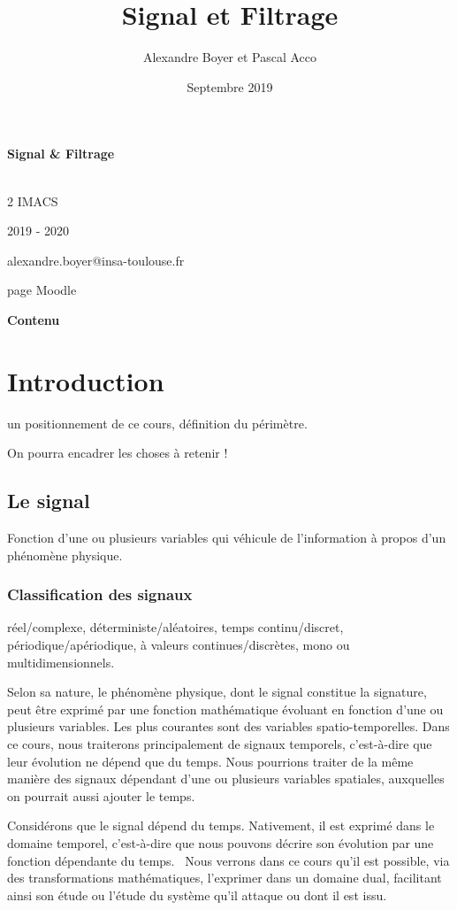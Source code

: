 \documentclass[]{report}
\title{{\huge Signal et Filtrage}}
\author{Alexandre Boyer et Pascal Acco}
\date{Septembre 2019}
\begin{document}
	\maketitle
	
	\textbf{Signal \& Filtrage}
	
	\textbf{}\\
	
	2 IMACS
	
	2019 - 2020
	
	alexandre.boyer@insa-toulouse.fr
	
	page Moodle
	
	\textbf{Contenu}
	\tableofcontents
	
	
\chapter{Introduction}
	
	un positionnement de ce cours, définition du périmètre.
	
	On pourra encadrer les choses à retenir !
	
	\section{Le signal}
	
	
	Fonction d'une ou plusieurs variables qui véhicule de l'information à
	propos d'un phénomène physique.
	
	\subsection{Classification des signaux}
	
	réel/complexe, déterministe/aléatoires, temps continu/discret,
	périodique/apériodique, à valeurs continues/discrètes, mono ou
	multidimensionnels.
	
	Selon sa nature, le phénomène physique, dont le signal constitue la
	signature, peut être exprimé par une fonction mathématique évoluant en
	fonction d'une ou plusieurs variables. Les plus courantes sont des
	variables spatio-temporelles. Dans ce cours, nous traiterons
	principalement de signaux temporels, c'est-à-dire que leur évolution ne
	dépend que du temps. Nous pourrions traiter de la même manière des
	signaux dépendant d'une ou plusieurs variables spatiales, auxquelles on
	pourrait aussi ajouter le temps.
	
	Considérons que le signal dépend du temps. Nativement, il est exprimé
	dans le domaine temporel, c'est-à-dire que nous pouvons décrire son
	évolution par une fonction dépendante du temps.~ Nous verrons dans ce
	cours qu'il est possible, via des transformations mathématiques,
	l'exprimer dans un domaine dual, facilitant ainsi son étude ou l'étude
	du système qu'il attaque ou dont il est issu.
	
\end{document}
